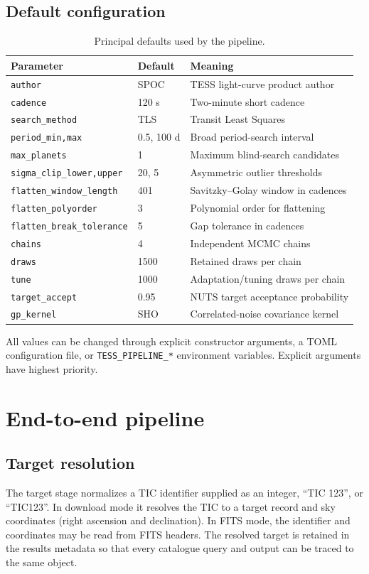 \documentclass[12pt,a4paper,oneside]{report}
\newcommand{\code}[1]{\texttt{\small #1}}
\begin{document}
\section{Default configuration}
\begin{longtable}{p{}p{}p{}}
\caption{Principal defaults used by the pipeline.}\label{tab:defaults}\\
\toprule
Parameter & Default & Meaning\\
\midrule
\code{author} & SPOC & TESS light-curve product author\\
\code{cadence} & 120 s & Two-minute short cadence\\
\code{search\_method} & TLS & Transit Least Squares\\
\code{period\_min,max} & 0.5, 100 d & Broad period-search interval\\
\code{max\_planets} & 1 & Maximum blind-search candidates\\
\code{sigma\_clip\_lower,upper} & 20, 5 & Asymmetric outlier thresholds\\
\code{flatten\_window\_length} & 401 & Savitzky--Golay window in cadences\\
\code{flatten\_polyorder} & 3 & Polynomial order for flattening\\
\code{flatten\_break\_tolerance} & 5 & Gap tolerance in cadences\\
\code{chains} & 4 & Independent MCMC chains\\
\code{draws} & 1500 & Retained draws per chain\\
\code{tune} & 1000 & Adaptation/tuning draws per chain\\
\code{target\_accept} & 0.95 & NUTS target acceptance probability\\
\code{gp\_kernel} & SHO & Correlated-noise covariance kernel\\
\bottomrule
\end{longtable}
All values can be changed through explicit constructor arguments, a TOML
configuration file, or \code{TESS\_PIPELINE\_*} environment variables. Explicit
arguments have highest priority.

\chapter{End-to-end pipeline}
\section{Target resolution}
The target stage normalizes a TIC identifier supplied as an integer, ``TIC
123'', or ``TIC123''. In download mode it resolves the TIC to a target record
and sky coordinates (right ascension and declination). In FITS mode, the
identifier and coordinates may be read from FITS headers. The resolved target
is retained in the results metadata so that every catalogue query and output
can be traced to the same object.
\end{document}
